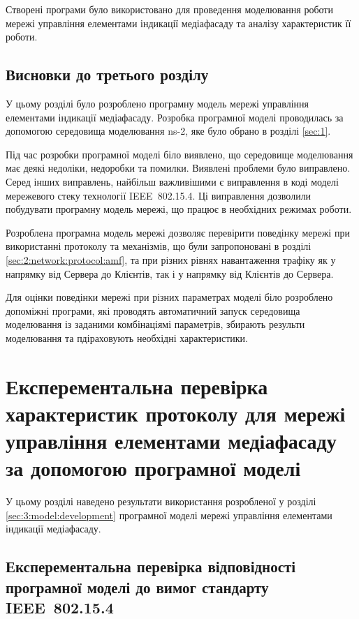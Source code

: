 \documentclass[a4paper,ukrainian,utf8,nocolumnsxix,floatsection,equationsection]{eskdtext}
\newcommand{\iee}[0]{IEEE~802.15.4\xspace}
\begin{document}
Створені програми було використовано для проведення моделювання роботи мережі управління елементами індикації медіафасаду та аналізу характеристик її роботи. 

\subsection{Висновки до третього розділу}

У цьому розділі було розроблено програмну модель мережі управління елементами індикації медіафасаду. Розробка програмної моделі проводилась за допомогою середовища моделювання ns-2, яке було обрано в розділі \ref{sec:1}.

Під час розробки програмної моделі біло виявлено, що середовище моделювання має деякі недоліки, недоробки та помилки. Виявлені проблеми було виправлено. Серед інших виправлень, найбільш важливішими є виправлення в коді моделі мережевого стеку технології \iee. Ці виправлення дозволили побудувати програмну модель мережі, що працює в необхідних режимах роботи. 

Розроблена програмна модель мережі дозволяє перевірити поведінку мережі при використанні протоколу та механізмів, що були запропоновані в розділі \ref{sec:2:network:protocol:amf}, та при різних рівнях навантаження трафіку як у напрямку від Сервера до Клієнтів, так і у напрямку від Клієнтів до Сервера.

Для оцінки поведінки мережі при різних параметрах моделі біло розроблено допоміжні програми, які проводять автоматичний запуск середовища моделювання із заданими комбінаціямі параметрів, збирають результи моделювання та пдіраховують необхідні характеристики.

\section{Експерементальна перевірка характеристик протоколу для мережі управління елементами медіафасаду за допомогою програмної моделі}
\label{sec:4:modelling}

У цьому розділі наведено результати використання розробленої у розділі \ref{sec:3:model:development} програмної моделі мережі управління елементами індикації медіафасаду.

\subsection{Експерементальна перевірка відповідності програмної моделі до вимог стандарту \iee}
\label{sub:simulation_speed_test}
\end{document}
